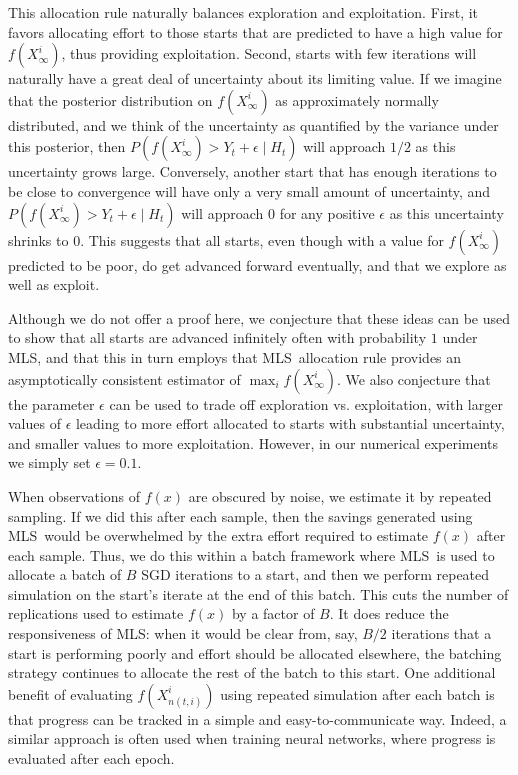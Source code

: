 \documentclass{wscpaperproc}
\theoremstyle{wsc}
\newcommand{\abbrv}{MLS}
\begin{document}
This allocation rule naturally balances exploration and exploitation.  First, it favors allocating effort to those starts that are predicted to have a high value for $f(X_\infty^i)$, thus providing exploitation. 
Second, starts with few iterations will naturally have a great deal of uncertainty about its limiting value.  If we imagine that the posterior distribution on $f(X_{\infty}^{i})$ as approximately normally distributed, and we think of the uncertainty as quantified by the variance under this posterior, then  $P\left(f\left(X_{\infty}^{i}\right)>Y_t+\epsilon\mid H_{t}\right)$ will approach $1/2$ as this uncertainty grows large.   Conversely, another start that has enough iterations to be close to convergence will have only a very small amount of uncertainty, and  $P\left(f\left(X_{\infty}^{i}\right)>Y_t+\epsilon\mid H_{t}\right)$ will approach $0$ for any positive $\epsilon$ as this uncertainty shrinks to $0$. 
This suggests that all starts, even though with a value for $f(X_\infty^i)$ predicted to be poor, do get advanced forward eventually, and that we explore as well as exploit.

Although we do not offer a proof here, we conjecture that these ideas can be used to show that all starts are advanced infinitely often with probability $1$ under \abbrv, and that this in turn employs that \abbrv\ allocation rule provides an asymptotically consistent estimator of $\max_i f(X_\infty^i)$.
We also conjecture that the parameter $\epsilon$ can be used to trade off exploration vs. exploitation, with larger values of $\epsilon$ leading to more effort allocated to starts with substantial uncertainty, and smaller values to more exploitation. However, in our numerical experiments we simply set $\epsilon=0.1$.

When observations of $f(x)$ are obscured by noise, we estimate it by repeated sampling.  If we did this after each sample, then the savings generated using \abbrv\ would be overwhelmed by the extra effort required to estimate $f(x)$ after each sample.  Thus, we do this within a batch framework where \abbrv\ is used to allocate a batch of $B$ SGD iterations to a start, and then we perform repeated simulation on the start's iterate at the end of this batch.  This cuts the number of replications used to estimate $f(x)$ by a factor of $B$.  It does reduce the responsiveness of \abbrv: when it would be clear from, say, $B/2$ iterations that a start is performing poorly and effort should be allocated elsewhere, the batching strategy continues to allocate the rest of the batch to this start.  
One additional benefit of evaluating $f(X_{n(t,i)}^i)$ using repeated simulation after each batch is that progress can be tracked in a simple and easy-to-communicate way.  Indeed, a similar approach is often used when training neural networks, where progress is evaluated after each epoch.
\end{document}
